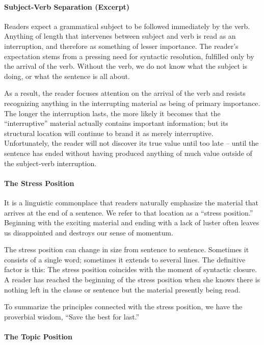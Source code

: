 \paragraph{Subject-Verb Separation (Excerpt)}

  Readers expect a grammatical subject to be followed immediately by the verb. Anything of length that intervenes between subject and verb is read as an interruption, and therefore as something of lesser importance.
The reader’s expectation stems from a pressing need for syntactic resolution, fulfilled only by the arrival of the verb. Without the verb, we do not know what the subject is doing, or what the sentence is all about.

As a result, the reader focuses attention on the arrival of the verb and resists recognizing anything in the interrupting material as being of primary importance.
The longer the interruption lasts, the more likely it becomes that the “interruptive” material actually contains important information; but its structural location will continue to brand it as merely interruptive.
Unfortunately, the reader will not discover its true value until too late – until the sentence has ended without having produced anything of much value outside of the subject-verb interruption.

\paragraph{The Stress Position}

It is a linguistic commonplace that readers naturally emphasize the material that arrives at the end of a sentence. We refer to that location as a “stress position.”
Beginning with the exciting material and ending with a lack of luster often leaves us disappointed and destroys our sense of momentum.

The stress position can change in size from sentence to sentence. Sometimes it consists of a single word; sometimes it extends to several lines. The definitive factor is this: The stress position coincides with the moment of syntactic closure. A reader has reached the beginning of the stress position when she knows there is nothing left in the clause or sentence but the material presently being read.

To summarize the principles connected with the stress position, we have the proverbial wisdom, “Save the best for last.”

\paragraph{The Topic Position}

